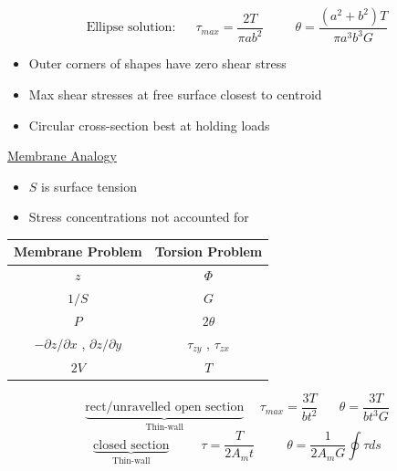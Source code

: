 \documentclass[twocolumn, 12pt]{article}    %
\begin{document}
\begin{equation*}
    \text{Ellipse solution: } \hspace{15pt} \tau_{max} = \frac{2T}{\pi ab^2} \hspace{30pt} \theta = \frac{(a^2+b^2)T}{\pi a^3b^3G}
\end{equation*}
\begin{itemize}
    \item Outer corners of shapes have zero shear stress
    \item Max shear stresses at free surface closest to centroid
    \item Circular cross-section best at holding loads
\end{itemize}
\underline{Membrane Analogy}\\
\begin{itemize}
    \item \(S\) is surface tension
    \item Stress concentrations not accounted for
\end{itemize}
\begin{table}[h!]
    \footnotesize
    \centering
    \begin{tabular}{cc}
        Membrane Problem & Torsion Problem \\
        \hline
        \(z\) & \(\Phi\) \\
        \(1/S\) & \(G\) \\
        \(P\) & \(2\theta\) \\
        \( -\partial z / \partial x \) , \(\partial z / \partial y \) & \(\tau_{zy}\) , \(\tau_{zx}\) \\
        \(2 V\) & \(T\) \\
        \hline
    \end{tabular}
\end{table}
\begin{equation*}
    \underbrace{ \text{rect/unravelled open section}}_\text{Thin-wall} \hspace{15pt} \tau_{max}  = \frac{3T}{bt^2} \hspace{20pt} \theta = \frac{3T}{bt^3G}
\end{equation*}
\begin{equation*}
    \underbrace{ \text{closed section}}_\text{Thin-wall} \hspace{30pt} \tau =\frac{T}{2A_mt} \hspace{30pt} \theta = \frac{1}{2A_mG} \oint \tau ds
\end{equation*}
\end{document}
